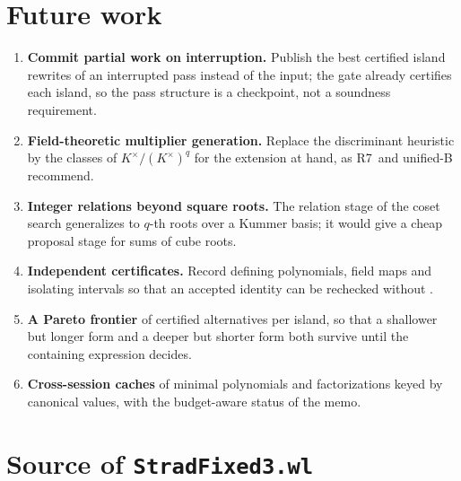 \documentclass[11pt,oneside]{article}
\numberwithin{equation}{section}
\theoremstyle{definition}
\theoremstyle{remark}
\newcommand{\code}[1]{\texttt{\detokenize{#1}}}
\newcommand{\RVII}{\textsf{R7}}
\begin{document}
\section{Future work}\label{sec:future}
\begin{enumerate}
\item \textbf{Commit partial work on interruption.} Publish the best certified island rewrites of an interrupted pass instead of the input; the gate already certifies each island, so the pass structure is a checkpoint, not a soundness requirement.
\item \textbf{Field-theoretic multiplier generation.} Replace the discriminant heuristic by the classes of $K^\times/(K^\times)^q$ for the extension at hand, as \RVII\ and unified-B recommend.
\item \textbf{Integer relations beyond square roots.} The relation stage of the coset search generalizes to $q$-th roots over a Kummer basis; it would give a cheap proposal stage for sums of cube roots.
\item \textbf{Independent certificates.} Record defining polynomials, field maps and isolating intervals so that an accepted identity can be rechecked without \code{RootReduce}.
\item \textbf{A Pareto frontier} of certified alternatives per island, so that a shallower but longer form and a deeper but shorter form both survive until the containing expression decides.
\item \textbf{Cross-session caches} of minimal polynomials and factorizations keyed by canonical values, with the budget-aware status of the memo.
\end{enumerate}

\appendix
\section{Source of \texttt{StradFixed3.wl}}\label{app:source}

\end{document}

